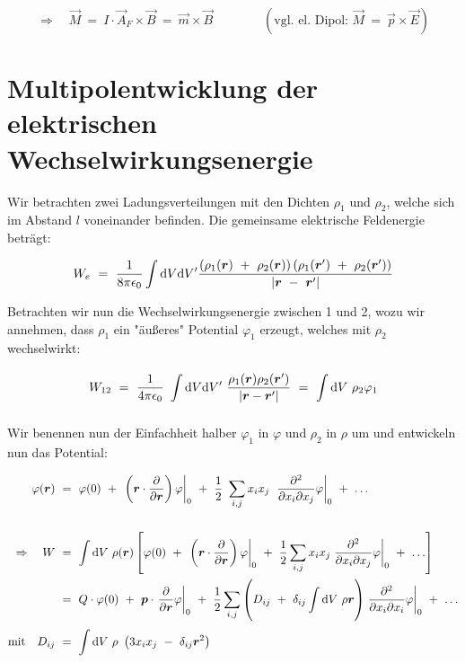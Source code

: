 \begin{equation*}
\Rightarrow \quad \vec{M}  \ = \ I\cdot \vec{A}_F \times \vec{B} \ = \ \vec{m}\times\vec{B} \qquad\qquad (\text{vgl. el. Dipol: } \vec{M}  \ = \ \vec{p}\times\vec{E})
\end{equation*}

\section{Multipolentwicklung der elektrischen Wechselwirkungsenergie}

Wir betrachten zwei Ladungsverteilungen mit den Dichten $\rho_1$ und $\rho_2$, welche sich im Abstand $l$ voneinander befinden. Die gemeinsame elektrische Feldenergie beträgt:

\begin{equation*}
W_e \ = \ \frac{1}{8\pi\epsilon_0}\int\d V \d V' \frac{\left(\rho_1(\vec{r}) \ + \ \rho
_2(\vec{r})\right)\left(\rho_1 (\vec{r}') \ + \ \rho_2(\vec{r}')\right)}{|\vec{r} \ - \ \vec{r}'|}
\end{equation*}

Betrachten wir nun die Wechselwirkungsenergie zwischen 1 und 2, wozu wir annehmen, dass $\rho_1$ ein "äußeres" Potential $\varphi_1$ erzeugt, welches mit $\rho_2$ wechselwirkt:

\begin{equation*}
W_{12} \ = \  \frac{1}{4\pi\epsilon_0} \ \int\d V \d V' \ \frac{\rho_1(\vec{r})\rho_2(\vec{r}')}{|\vec{r}-\vec{r}'|} \ = \ \Int{}{}{V} \rho_2\varphi_1
\end{equation*}

Wir benennen nun der Einfachheit halber $\varphi_1$ in $\varphi$ und $\rho_2$ in $\rho$ um und entwickeln nun das Potential:

\begin{align*}
\varphi(\vec{r})  \ &= \  \varphi(0) \ + \ \left.\left(\vec{r}\cdot\pdiff{}{\vec{r}}\right)\varphi\right|_0 \ + \ \frac{1}{2}\ \sum_{i,j} x_i x_j \ \left.\frac{\partial ^2}{\partial x_i  \partial x_j}\varphi\right|_0 \ + \ \ldots \\
\ \\
\Rightarrow \quad W \ &= \ \Int{}{}{V}\rho(\vec{r})\left[\varphi(0) \ + \ \left.\left(\vec{r}\cdot\pdiff{}{\vec{r}}\right)\varphi\right|_0 \ + \ \frac{1}{2} \sum_{i,j}x_i x_j \left.\frac{\partial^2}{\partial x_i \partial x_j}\varphi\right|_0 \ + \ \ldots\right]\\
&= \ Q\cdot\varphi(0) \ + \ \vec{p}\cdot\left.\pdiff{}{\vec{r}}\varphi\right|_0 \ + \ \frac{1}{2}\sum_{i,j}\left(D_{ij} \ + \ \delta_{ij}\Int{}{}{V}\rho\vec{r}\right)\left.\frac{\partial^2}{\partial x_i \partial x_i}\varphi\right|_0 \ + \ \ldots\\
\text{mit} \quad D_{ij} \ &= \ \Int{}{}{V} \rho \ \left(3x_i x_j\ - \ \delta_{ij}\vec{r}^2\right)
\end{align*}

